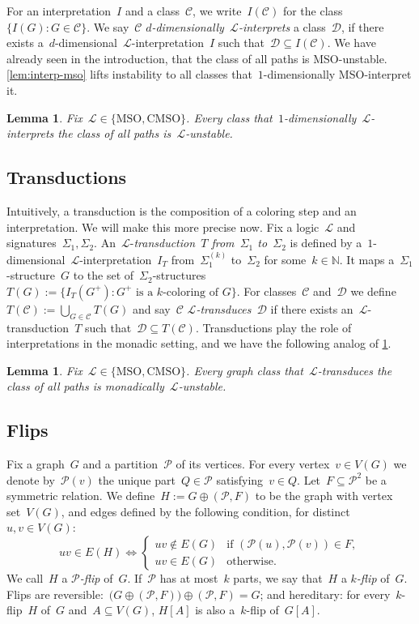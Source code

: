 \documentclass[11pt]{article}      \usepackage[margin=1in]{geometry}  \usepackage{microtype}
\newtheorem{lemma}[theorem]{Lemma}
\theoremstyle{definition}
\newcommand{\N}[0]{\mathrm{\mathbb{N}}}
\newcommand{\LL}{\mathcal{L}}
\newcommand{\DD}{\mathcal{D}}
\newcommand{\MSO}{\mathrm{MSO}}
\newcommand{\CMSO}{\mathrm{CMSO}}
\newcommand{\CC}{\mathcal{C}}
\newcommand{\PP}{\mathcal{P}}
\begin{document}
For an interpretation~$I$ and a class~$\CC$, we write~$I(\CC)$ for the class~$\{ I(G) : G \in \CC \}$.
We say~$\CC$ \emph{$d$-dimensionally~$\LL$-interprets} a class~$\DD$, if there exists a~$d$-dimensional~$\LL$-interpretation~$I$ such that~$\DD \subseteq I(\CC)$.
We have already seen in the introduction, that the class of all paths is MSO-unstable. 
\cref{lem:interp-mso} lifts instability to all classes that~$1$-dimensionally MSO-interpret it.

\begin{lemma}\label{lem:unstable-interp}
  Fix~$\LL\in\{\MSO,\CMSO\}$.
  Every class that~$1$-dimensionally~$\LL$-interprets the class of all paths is~$\LL$-unstable.
\end{lemma}


\subsection{Transductions}
Intuitively, a transduction is the composition of a coloring step and an interpretation. We will make this more precise now.
Fix a logic~$\LL$ and signatures~$\Sigma_1, \Sigma_2$.
An~$\LL$-\emph{transduction~$T$ from~$\Sigma_1$ to~$\Sigma_2$} is defined by a~$1$-dimensional~$\LL$-interpretation~$I_T$ from~$\Sigma_1^{(k)}$ to~$\Sigma_2$ for some~$k \in \N$.
It maps a~$\Sigma_1$-structure~$G$ to the set of~$\Sigma_2$-structures~$T(G) := \{ I_T(G^+) : G^+ \text{ is a~$k$-coloring of~$G$} \}$.
For classes~$\CC$ and~$\DD$ we define~$T(\CC) := \bigcup_{G\in\CC} T(G)$ and
say~$\CC$ \emph{$\LL$-transduces~$\DD$} if there exists an~$\LL$-transduction~$T$ such that~$\DD \subseteq T(\CC)$.
Transductions play the role of interpretations in the monadic setting, and we have the following analog of \cref{lem:unstable-interp}.

\begin{lemma}\label{lem:unstable-trans}
    Fix~$\LL\in\{\MSO,\CMSO\}$.
    Every graph class that~$\LL$-transduces the class of all paths is monadically~$\LL$-unstable.
\end{lemma}

 
\subsection{Flips}
Fix a graph~$G$ and a partition~$\PP$ of its vertices.
For every vertex~$v \in V(G)$ we denote by~$\PP(v)$ the unique part~$Q \in \PP$ satisfying~$v \in Q$.
Let~$F \subseteq \PP^2$ be a symmetric relation.
We define~$H := G \oplus (\PP,F)$ to be the graph with vertex set~$V(G)$,
and edges defined by the following condition, for distinct~$u,v\in V(G)$:
\[
    uv \in E(H) \Leftrightarrow \begin{cases}
        uv \notin E(G) & \text{if } (\PP(u), \PP(v)) \in F,\\
        uv \in E(G) & \text{otherwise.}
    \end{cases}
\]
We call~$H$ a \emph{$\PP$-flip} of~$G$.
If~$\PP$ has at most~$k$ parts, we say that~$H$ a \emph{$k$-flip} of~$G$.
Flips are reversible:~$\big(G \oplus (\PP,F)\big) \oplus (\PP,F) = G$; and hereditary:
for every~$k$-flip~$H$ of~$G$ and~$A\subseteq V(G)$,
$H[A]$ is also a~$k$-flip of~$G[A]$.
\end{document}
